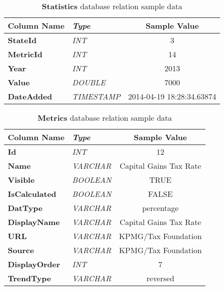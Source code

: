 			\begin{table}[h]
				\centering
				\begin{tabularx}{\textwidth}{@{} >{\bf}Y >{\em}l c @{}} %
					\toprule
					Column Name	& Type		& Sample Value				\\
					\midrule
					
					StateId		& INT		& 3							\\
					MetricId	& INT		& 14						\\
					Year		& INT		& 2013						\\
					Value		& DOUBLE	& 7000						\\
					DateAdded	& TIMESTAMP	& 2014-04-19 18:28:34.63874	\\
					
					\bottomrule
				\end{tabularx}
				\caption{\textbf{Statistics} database relation sample data}
				\label{tbl:statstable}
			\end{table}
			
			\begin{table}[h]
				\centering
				\begin{tabularx}{\textwidth}{@{} >{\bf}Y >{\em}l c @{}} %
					\toprule
					Column Name		& Type		& Sample Value				\\
					\midrule
					
					Id				& INT		& 12						\\
					Name			& VARCHAR	& Capital Gains Tax Rate	\\
					Visible			& BOOLEAN	& TRUE						\\
					IsCalculated	& BOOLEAN	& FALSE						\\
					DatType			& VARCHAR	& percentage				\\
					DisplayName		& VARCHAR	& Capital Gains Tax Rate	\\
					URL				& VARCHAR	& KPMG/Tax Foundation		\\
					Source			& VARCHAR	& KPMG/Tax Foundation		\\
					DisplayOrder	& INT		& 7							\\
					TrendType		& VARCHAR	& reversed					\\
					
					\bottomrule
				\end{tabularx}
				\caption{\textbf{Metrics} database relation sample data}
				\label{tbl:metrictable}
			\end{table}
			

